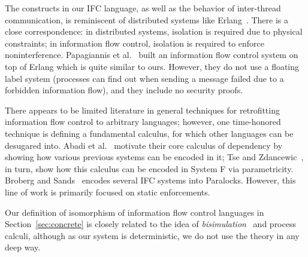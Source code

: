 

The constructs in our IFC language, as well as the behavior of
inter-thread communication, is reminiscent of distributed systems
like Erlang~\cite{Armstrong03makingreliable}.  There is a close
correspondence: in distributed systems, isolation is required due to
physical constraints; in information flow control, isolation is
required to enforce noninterference.  Papagiannis et al.~\cite{Papagiannis_enforcinguser}
built an information flow control system on top of Erlang which is quite
similar to ours.  However, they do not use a floating label system (processes
can find out when sending a message failed due to a forbidden information flow),
and they include no security proofs.

There appears to be limited literature in general techniques for retrofitting
information flow control to arbitrary languages; however, one time-honored
technique is defining a fundamental calculus, for which other languages can be
desugared into.  Abadi et al.~\cite{abadi+:core} motivate their core calculus of
dependency by showing how various previous systems can be encoded in it; Tse and
Zdancewic~\cite{Tse:Zdancewic:ICFP04}, in turn, show how this calculus can be
encoded in System F via parametricity.  Broberg and Sands~\cite{Broberg:2010}
encodes several IFC systems into Paralocks.  However, this line of work is
primarily focused on static enforcements. 

Our definition of isomorphism of information flow control languages in
Section~\ref{sec:concrete} is closely related to the idea of
\emph{bisimulation}~\cite{Milner:1989:CC:534666} and process calculi,
although as our system is deterministic, we do not use the theory in any
deep way.

